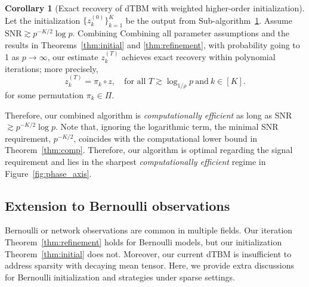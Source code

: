 \documentclass[journal]{IEEEtran}
\theoremstyle{definition}
\newtheorem{cor}{Corollary}
\theoremstyle{definition}
\begin{document}
\begin{cor}[Exact recovery of dTBM with weighted higher-order initialization]  Let the initialization $\{z^{(0)}_k\}_{k = 1}^K$ be the output from Sub-algorithm~\hyperref[alg:main]{1}. Assume $\text{SNR} \gtrsim p^{-K/2} \log p$. Combining  Combining {all parameter assumptions and the results in} Theorems~\ref{thm:initial} and \ref{thm:refinement}, with probability going to 1 {as $p \rightarrow \infty$}, our estimate $z^{(T)}_k$ achieves exact recovery within polynomial iterations; more precisely,
\begin{equation}
     z^{(T)}_k = \pi_k \circ z, \quad \text{for all }T\gtrsim \log_{1/\rho} p\  \text{and}\ k \in [K ].
\end{equation}
for some permutation $\pi_k \in \Pi$. 
\end{cor}
Therefore, our combined algorithm is \textit{computationally efficient} as long as SNR $\gtrsim p^{-K/2} \log p$. Note that, ignoring the logarithmic term, the minimal SNR requirement, $p^{-K/2}$, coincides with the computational lower bound in Theorem~\ref{thm:comp}. Therefore, our algorithm is optimal regarding the signal requirement and lies in the sharpest \emph{computationally efficient} regime in Figure~\ref{fig:phase_axis}. 

\subsection{Extension to Bernoulli observations}\label{subsec:ber}

Bernoulli or network observations are common in multiple fields. Our iteration Theorem~\ref{thm:refinement} holds for Bernoulli models, but our initialization Theorem~\ref{thm:initial} does not. Moreover, our current dTBM is insufficient to address sparsity with decaying mean tensor. Here, we provide extra discussions for Bernoulli initialization and strategies under sparse settings.
\end{document}
